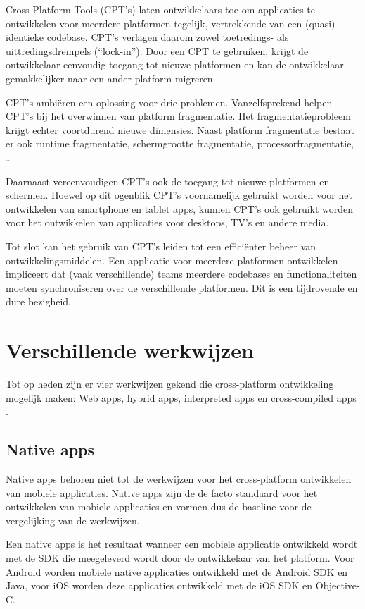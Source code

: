 \documentclass[a4paper,conference]{IEEEconf}
\begin{document}
Cross-Platform Tools (CPT's) laten ontwikkelaars toe om applicaties te ontwikkelen voor meerdere platformen tegelijk, vertrekkende van een (quasi) identieke codebase. CPT's verlagen daarom zowel toetredings- als uittredingsdrempels (``lock-in''). Door een CPT te gebruiken, krijgt de ontwikkelaar eenvoudig toegang tot nieuwe platformen en kan de ontwikkelaar gemakkelijker naar een ander platform migreren. \cite{VM_CPT:2012}

CPT's ambiëren een oplossing voor drie problemen. Vanzelfsprekend helpen CPT's bij het overwinnen van platform fragmentatie. Het fragmentatieprobleem krijgt echter voortdurend nieuwe dimensies. Naast platform fragmentatie bestaat er ook runtime fragmentatie, schermgrootte fragmentatie, processorfragmentatie, \ldots 

Daarnaast vereenvoudigen CPT's ook de toegang tot nieuwe platformen en schermen. Hoewel op dit ogenblik CPT's voornamelijk gebruikt worden voor het ontwikkelen van smartphone en tablet apps, kunnen CPT's ook gebruikt worden voor het ontwikkelen van applicaties voor desktops, TV's en andere media.

Tot slot kan het gebruik van CPT's leiden tot een efficiënter beheer van ontwikkelingsmiddelen. Een applicatie voor meerdere platformen ontwikkelen impliceert dat (vaak verschillende) teams meerdere codebases en functionaliteiten moeten synchroniseren over de verschillende platformen. Dit is een tijdrovende en dure bezigheid.

\section{Verschillende werkwijzen}

Tot op heden zijn er vier werkwijzen gekend die cross-platform ontwikkeling mogelijk maken: Web apps, hybrid apps, interpreted apps en cross-compiled apps \cite{Friese:2012}.

\subsection{Native apps}

Native apps behoren niet tot de werkwijzen voor het cross-platform ontwikkelen van mobiele applicaties. Native apps zijn de de facto standaard voor het ontwikkelen van mobiele applicaties en vormen dus de baseline voor de vergelijking van de werkwijzen. 

Een native apps is het resultaat wanneer een mobiele applicatie ontwikkeld wordt met de SDK die meegeleverd wordt door de ontwikkelaar van het platform. Voor Android worden mobiele native applicaties ontwikkeld met de Android SDK en Java, voor iOS worden deze applicaties ontwikkeld met de iOS SDK en Objective-C.
\end{document}
